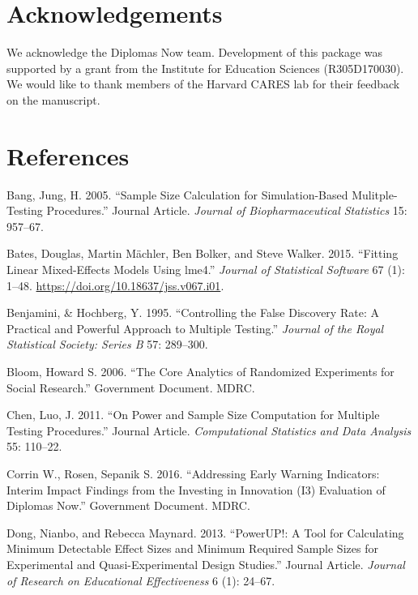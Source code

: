 \documentclass[
]{article}
\newlength{\cslhangindent}
\newlength{\cslentryspacingunit} %
\newenvironment{CSLReferences}[2] %
 {%
  \setlength{\parindent}{0pt}
  \ifodd #1
  \let\oldpar\par
  \def\par{\hangindent=\cslhangindent\oldpar}
  \fi
  \setlength{\parskip}{#2\cslentryspacingunit}
 }%
 {}
\begin{document}
\section*{Acknowledgements}

We acknowledge the Diplomas Now team. Development of this package was
supported by a grant from the Institute for Education Sciences
(R305D170030). We would like to thank members of the Harvard CARES lab
for their feedback on the manuscript.

\section{References}

\hypertarget{refs}{}
\begin{CSLReferences}{1}{0}
\leavevmode{}%
Bang, Jung, H. 2005. {``Sample Size Calculation for Simulation-Based
Mulitple-Testing Procedures.''} Journal Article. \emph{Journal of
Biopharmaceutical Statistics} 15: 957--67.

\leavevmode{}%
Bates, Douglas, Martin Mächler, Ben Bolker, and Steve Walker. 2015.
{``Fitting Linear Mixed-Effects Models Using {lme4}.''} \emph{Journal of
Statistical Software} 67 (1): 1--48.
\url{https://doi.org/10.18637/jss.v067.i01}.

\leavevmode{}%
Benjamini, \& Hochberg, Y. 1995. {``Controlling the False Discovery
Rate: A Practical and Powerful Approach to Multiple Testing.''}
\emph{Journal of the Royal Statistical Society: Series B} 57: 289--300.

\leavevmode{}%
Bloom, Howard S. 2006. {``The Core Analytics of Randomized Experiments
for Social Research.''} Government Document. MDRC.

\leavevmode{}%
Chen, Luo, J. 2011. {``On Power and Sample Size Computation for Multiple
Testing Procedures.''} Journal Article. \emph{Computational Statistics
and Data Analysis} 55: 110--22.

\leavevmode{}%
Corrin W., Rosen, Sepanik S. 2016. {``Addressing Early Warning
Indicators: Interim Impact Findings from the Investing in Innovation
(I3) Evaluation of Diplomas Now.''} Government Document. MDRC.

\leavevmode{}%
Dong, Nianbo, and Rebecca Maynard. 2013. {``PowerUP!: A Tool for
Calculating Minimum Detectable Effect Sizes and Minimum Required Sample
Sizes for Experimental and Quasi-Experimental Design Studies.''} Journal
Article. \emph{Journal of Research on Educational Effectiveness} 6 (1):
24--67.


\end{CSLReferences}
\end{document}
